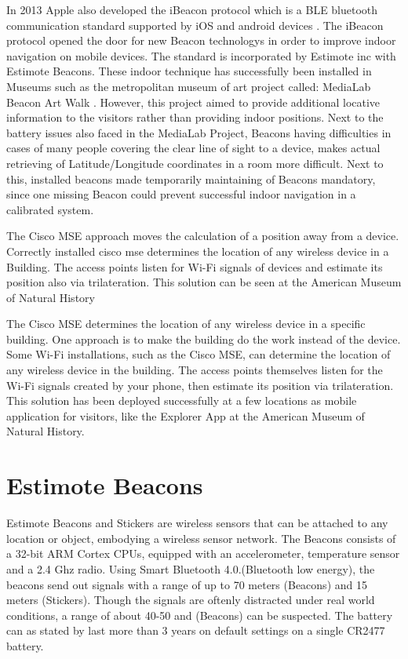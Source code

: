In 2013 Apple also developed the iBeacon protocol which is a BLE bluetooth communication standard supported by iOS and android devices \cite{appleIBeacon}. The iBeacon protocol opened the door for new Beacon technologys in order to improve indoor navigation on mobile devices. The standard is incorporated by Estimote inc with Estimote Beacons.
These indoor technique has successfully been installed in Museums such as the metropolitan museum of art project called: MediaLab Beacon Art Walk \cite{MuseumArt}. However, this project aimed to provide additional locative information to the visitors rather than providing indoor positions. Next to the battery issues also faced in the MediaLab Project, Beacons having difficulties  in cases of many people covering the clear line of sight to a device, makes actual retrieving of Latitude/Longitude coordinates in a room more difficult. Next to this, installed beacons made  temporarily maintaining of Beacons mandatory, since one missing Beacon could prevent successful indoor navigation in a calibrated system.

The Cisco MSE approach moves the calculation of a position away from a device\cite{oreilly11}. Correctly installed cisco mse determines the location of any wireless device in a Building. The access points listen for Wi-Fi signals of devices and estimate its position also via trilateration. This solution can be seen at the American Museum of Natural History \cite{AMNH15}

The Cisco MSE determines the location of any wireless device in a specific building. 
One approach is to make the building do the work instead of the device. Some Wi-Fi installations, such as the Cisco MSE, can determine the location of any wireless device in the building. The access points themselves listen for the Wi-Fi signals created by your phone, then estimate its position via trilateration. This solution has been deployed successfully at a few locations as mobile application for visitors, like the Explorer App  at the American Museum of Natural History.



\vspace{0.5cm}



\section{Estimote Beacons}
Estimote Beacons and Stickers are wireless sensors that can be attached to any location or object, embodying a wireless sensor network. The Beacons consists of a 32-bit ARM Cortex CPUs, equipped with an accelerometer, temperature sensor and a 2.4 Ghz radio. Using Smart Bluetooth 4.0.(Bluetooth low energy), the beacons send out signals with a range of up to 70 meters (Beacons) and 15 meters (Stickers). Though the signals are oftenly distracted under real world conditions, a range of about 40-50 and (Beacons) can be suspected. The battery can as stated by  \cite{developerDocsEstimote} last more than 3 years on default settings on a single CR2477 battery.

